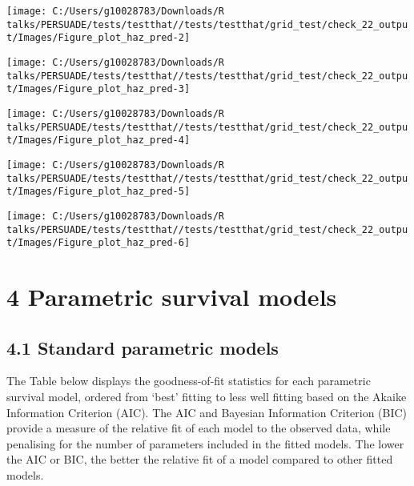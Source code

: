 \documentclass[
]{article}
\begin{document}
\begin{flushleft}\texttt{[image: C:/Users/g10028783/Downloads/R talks/PERSUADE/tests/testthat//tests/testthat/grid\_test/check\_22\_output/Images/Figure\_plot\_haz\_pred-2]} \end{flushleft}

\begin{flushleft}\texttt{[image: C:/Users/g10028783/Downloads/R talks/PERSUADE/tests/testthat//tests/testthat/grid\_test/check\_22\_output/Images/Figure\_plot\_haz\_pred-3]} \end{flushleft}

\begin{flushleft}\texttt{[image: C:/Users/g10028783/Downloads/R talks/PERSUADE/tests/testthat//tests/testthat/grid\_test/check\_22\_output/Images/Figure\_plot\_haz\_pred-4]} \end{flushleft}

\begin{flushleft}\texttt{[image: C:/Users/g10028783/Downloads/R talks/PERSUADE/tests/testthat//tests/testthat/grid\_test/check\_22\_output/Images/Figure\_plot\_haz\_pred-5]} \end{flushleft}

\begin{flushleft}\texttt{[image: C:/Users/g10028783/Downloads/R talks/PERSUADE/tests/testthat//tests/testthat/grid\_test/check\_22\_output/Images/Figure\_plot\_haz\_pred-6]} \end{flushleft}

\clearpage

\section{4 Parametric survival models}\label{parametric-survival-models}

\subsection{4.1 Standard parametric
models}\label{standard-parametric-models}

The Table below displays the goodness-of-fit statistics for each
parametric survival model, ordered from `best' fitting to less well
fitting based on the Akaike Information Criterion (AIC). The AIC and
Bayesian Information Criterion (BIC) provide a measure of the relative
fit of each model to the observed data, while penalising for the number
of parameters included in the fitted models. The lower the AIC or BIC,
the better the relative fit of a model compared to other fitted models.
\end{document}
